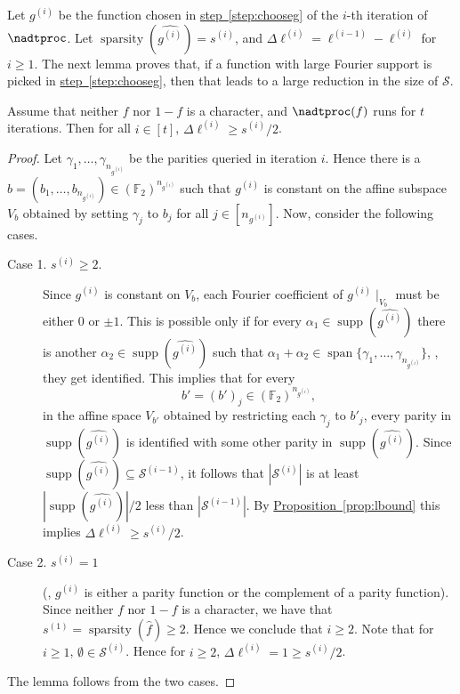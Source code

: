 \documentclass{toc}
\DeclareMathOperator{\Supp}{supp}
\DeclareMathOperator{\spa}{sparsity}
\DeclareMathOperator{\vspan}{span}
\newcommand{\lref}[2][]{\hyperref[#2]{#1~\ref*{#2}}}
\begin{document}
Let $g^{(i)}$ be the function chosen in \lref[step]{step:chooseg} of the
$i$-th iteration of $\nadtproc$. Let $\spa(\widehat{g^{(i)}}) = s^{(i)}$, and $\Delta \ell^{(i)}= \ell^{(i-1)} - \ell^{(i)}$ for $i \geq 1$. The next lemma proves that, if a function with large Fourier support is picked in \lref[step]{step:chooseg}, then that leads to a large reduction in
the size of $\mathcal{S}$.
\begin{lemma}
\label{lem:reduction}
Assume that neither $f$ nor $1-f$ is a character, and $\nadtproc(f)$ runs for $t$ iterations. Then for all $i\in [t]$, $\Delta \ell^{(i)} \geq {s^{(i)}}/{2}$.
\end{lemma}
\begin{proof}
  Let $\gamma_1,\ldots,\gamma_{n_{g^{(i)}}}$ be the parities queried
  in iteration $i$.  Hence there is a
  $b=(b_1,\ldots,b_{n_{g^{(i)}}}) \in
  \left(\mathbb{F}_2\right)^{n_{g^{(i)}}}$ such that $g^{(i)}$ is
  constant on the affine subspace $V_b$ obtained by setting $\gamma_j$
  to $b_j$ for all $j \in [n_{g^{(i)}}]$. Now, consider the following
  cases.
  \begin{description}
   \item [Case 1. $s^{(i)} \geq 2$.]  %
  Since $g^{(i)}$ is
  constant on $V_b$, each Fourier coefficient of $g^{(i)}\mid_{V_b}$ must be either $0$ or $\pm 1$. This is possible only if for every $\alpha_1 \in \Supp(\widehat{g^{(i)}})$ there is another $\alpha_2 \in \Supp(\widehat{g^{(i)}})$ such that $\alpha_1+\alpha_2 \in \vspan \{\gamma_1, \ldots, \gamma_{n_{g^{(i)}}}\}$, \ie, they get identified. This implies that for every
  \[
    b' =(b')_j \in
    \left(\mathbb{F}_2\right)^{n_{g^{(i)}}},
  \]
  in the affine space $V_{b'}$ obtained by restricting each $\gamma_j$
  to $b'_j$, every parity in $\Supp(\widehat{g^{(i)}})$ is identified
  with some other parity in $\Supp(\widehat{g^{(i)}})$. Since
  $\Supp(\widehat{g^{(i)}}) \subseteq \mathcal{S}^{(i-1)}$, it follows
  that $|\mathcal{S}^{(i)}|$ is at least
  $|\Supp(\widehat{g^{(i)}})|/{2}$ less than
  $|\mathcal{S}^{(i-1)}|$. By \lref[Proposition]{prop:lbound} this
  implies $\Delta \ell^{(i)} \geq {s^{(i)}}/{2}$.
%
 \item [Case 2. $s^{(i)}=1$]   %
(\ie, %
$g^{(i)}$ is either a parity function or the complement of a parity function). Since neither $f$ nor $1-f$ is a character, we have that $s^{(1)}=\spa(\widehat{f}) \geq 2$. Hence we conclude that $i \geq 2$. Note that for $i \geq 1$, $\emptyset \in \mathcal{S}^{(i)}$. Hence for $i \geq 2$, $\Delta \ell^{(i)}=1 \geq {s^{(i)}}/{2}$.
  \end{description}
The lemma follows from the two cases.
\end{proof}
\end{document}
